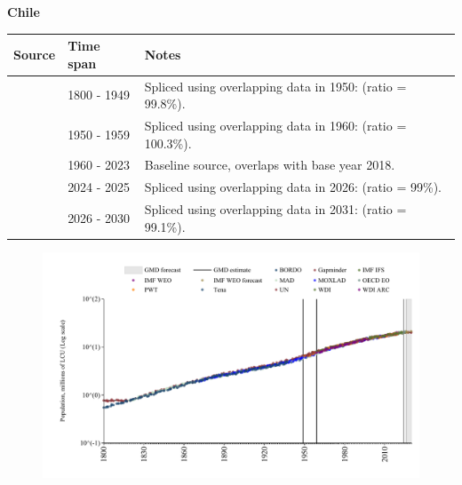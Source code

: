 \documentclass[12pt,a4paper,landscape]{article}
\begin{document}
\begin{adjustbox}{max totalsize={\paperwidth}{\paperheight},center}
\begin{minipage}[t][\textheight][t]{\textwidth}
\vspace*{0.5cm}
{}
\begin{center}
{\Large\bfseries Chile}
\end{center}
\vspace{0.5cm}
\begin{table}[H]
\centering
\small
\begin{tabular}{|l|l|l|}
\hline
\textbf{Source} & \textbf{Time span} & \textbf{Notes} \\
\hline
\rowcolor{white}\cite{Gapminder}& 1800 - 1949 &Spliced using overlapping data in 1950: (ratio = 99.8\%).\\
\rowcolor{lightgray}\cite{IMF_IFS}& 1950 - 1959 &Spliced using overlapping data in 1960: (ratio = 100.3\%).\\
\rowcolor{white}\cite{WDI}& 1960 - 2023 &Baseline source, overlaps with base year 2018.\\
\rowcolor{lightgray}\cite{OECD_EO}& 2024 - 2025 &Spliced using overlapping data in 2026: (ratio = 99\%).\\
\rowcolor{white}\cite{Gapminder}& 2026 - 2030 &Spliced using overlapping data in 2031: (ratio = 99.1\%).\\
\hline
\end{tabular}
\end{table}
\begin{figure}[H]
\centering
\includegraphics[width=\textwidth,height=0.6\textheight,keepaspectratio]{graphs/CHL_pop.pdf}
\end{figure}
\end{minipage}
\end{adjustbox}
\end{document}
